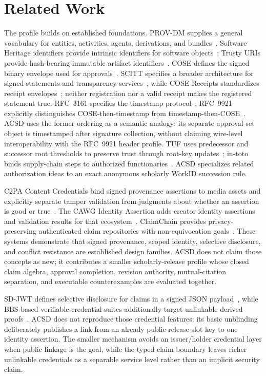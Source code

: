 \documentclass[11pt]{article}
\begin{document}
\section{Related Work}

The profile builds on established foundations. PROV-DM supplies a general vocabulary for entities, activities, agents, derivations, and bundles~\cite{prov}. Software Heritage identifiers provide intrinsic identifiers for software objects~\cite{swhid}; Trusty URIs provide hash-bearing immutable artifact identifiers~\cite{trusty}. COSE defines the signed binary envelope used for approvals~\cite{cose}. SCITT specifies a broader architecture for signed statements and transparency services~\cite{scitt}, while COSE Receipts standardizes receipt envelopes~\cite{cosereceipts}; neither registration nor a valid receipt makes the registered statement true. RFC~3161 specifies the timestamp protocol~\cite{rfc3161}; RFC~9921 explicitly distinguishes COSE-then-timestamp from timestamp-then-COSE~\cite{rfc9921}. ACSD uses the former ordering as a semantic analogy: its separate approval-set object is timestamped after signature collection, without claiming wire-level interoperability with the RFC~9921 header profile. TUF uses predecessor and successor root thresholds to preserve trust through root-key updates~\cite{tufspec}; in-toto binds supply-chain steps to authorized functionaries~\cite{intoto}. ACSD specializes related authorization ideas to an exact anonymous scholarly WorkID succession rule.

C2PA Content Credentials bind signed provenance assertions to media assets and
explicitly separate tamper validation from judgments about whether an assertion
is good or true~\cite{c2pa}. The CAWG Identity Assertion adds creator identity
assertions and validation results for that ecosystem~\cite{cawg}. ClaimChain
provides privacy-preserving authenticated claim repositories with
non-equivocation goals~\cite{claimchain}. These systems demonstrate that signed
provenance, scoped identity, selective disclosure, and conflict resistance are
established design families. ACSD does not claim those concepts as new; it
contributes a smaller scholarly-release profile whose closed claim algebra,
approval completion, revision authority, mutual-citation separation, and
executable counterexamples are evaluated together.

SD-JWT defines selective disclosure for claims in a signed JSON payload~\cite{sdjwt}, while BBS-based verifiable-credential suites additionally target unlinkable derived proofs~\cite{bbs}. ACSD does not reproduce those credential features: its basic unblinding deliberately publishes a link from an already public release-slot key to one identity assertion. The smaller mechanism avoids an issuer/holder credential layer when public linkage is the goal, while the typed claim boundary leaves richer unlinkable credentials as a separable service level rather than an implicit security claim.
\end{document}
